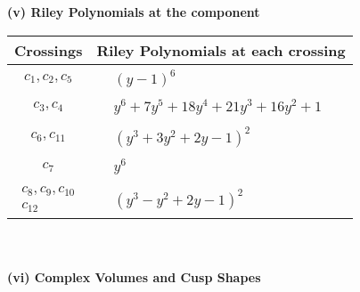 \documentclass[1p]{elsarticle_modified}
\theoremstyle{definition}
\begin{document}
\newpage\renewcommand{\arraystretch}{1}
\flushleft \textbf{(v) Riley Polynomials at the component}\newline \\
\begin{tabular}{m{50pt}|m{274pt}}
Crossings & \hspace{64pt}Riley Polynomials at each crossing \\
\hline $$\begin{aligned}c_{1},c_{2},c_{5}\end{aligned}$$&$\begin{aligned}
&(y-1)^6
\end{aligned}$\\
\hline $$\begin{aligned}c_{3},c_{4}\end{aligned}$$&$\begin{aligned}
&y^6+7 y^5+18 y^4+21 y^3+16 y^2+1
\end{aligned}$\\
\hline $$\begin{aligned}c_{6},c_{11}\end{aligned}$$&$\begin{aligned}
&(y^3+3 y^2+2 y-1)^2
\end{aligned}$\\
\hline $$\begin{aligned}c_{7}\end{aligned}$$&$\begin{aligned}
&y^6
\end{aligned}$\\
\hline $$\begin{aligned}c_{8},c_{9},c_{10}\\c_{12}\end{aligned}$$&$\begin{aligned}
&(y^3- y^2+2 y-1)^2
\end{aligned}$\\
\hline
\end{tabular}\\~\\
\newpage\flushleft \textbf{(vi) Complex Volumes and Cusp Shapes}
\end{document}
